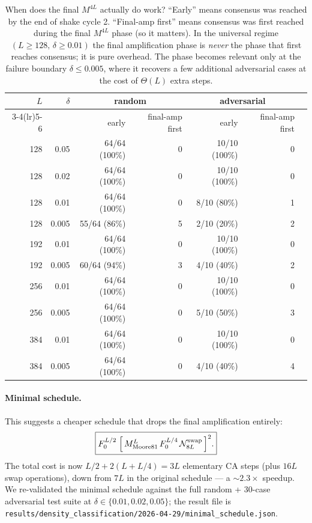 \documentclass[11pt,a4paper]{article}
\newcommand{\fpath}[1]{\nolinkurl{#1}}
\begin{document}
\begin{table}[h]\centering\small
\begin{tabular}{r r r r r r r}
\toprule
$L$ & $\delta$
    & \multicolumn{2}{c}{random}
    & \multicolumn{2}{c}{adversarial}
    & \\
\cmidrule(lr){3-4}\cmidrule(lr){5-6}
    &       & early & final-amp first & early & final-amp first \\
\midrule
128 & 0.05  & 64/64 (100\%) & 0  & 10/10 (100\%) & 0  \\
128 & 0.02  & 64/64 (100\%) & 0  & 10/10 (100\%) & 0  \\
128 & 0.01  & 64/64 (100\%) & 0  &  8/10 (80\%)  & 1  \\
128 & 0.005 & 55/64 (86\%)  & 5  &  2/10 (20\%)  & 2  \\
\midrule
192 & 0.01  & 64/64 (100\%) & 0  & 10/10 (100\%) & 0  \\
192 & 0.005 & 60/64 (94\%)  & 3  &  4/10 (40\%)  & 2  \\
\midrule
256 & 0.01  & 64/64 (100\%) & 0  & 10/10 (100\%) & 0  \\
256 & 0.005 & 64/64 (100\%) & 0  &  5/10 (50\%)  & 3  \\
\midrule
384 & 0.01  & 64/64 (100\%) & 0  & 10/10 (100\%) & 0  \\
384 & 0.005 & 64/64 (100\%) & 0  &  4/10 (40\%)  & 4  \\
\bottomrule
\end{tabular}
\caption{When does the final \(M^{4L}\) actually do work?  ``Early'' means
consensus was reached by the end of shake cycle 2.  ``Final-amp first'' means
consensus was first reached during the final \(M^{4L}\) phase (so it
matters).  In the universal regime
\((L\geq 128,\,\delta\geq 0.01)\) the final amplification phase is
\emph{never} the phase that first reaches consensus; it is pure
overhead.  The phase becomes relevant only at the failure boundary
\(\delta\leq 0.005\), where it recovers a few additional adversarial
cases at the cost of \(\Theta(L)\) extra steps.}
\label{tab:early-stop}
\end{table}

\paragraph{Minimal schedule.}
This suggests a cheaper schedule that drops the final amplification
entirely:
\[
\fbox{$
F_0^{L/2}
\;\Bigl[\,M_{\mathrm{Moore81}}^{L}\,F_0^{L/4}\,\mathcal{N}^{\mathrm{swap}}_{8L}\,\Bigr]^{2}.
$}
\]
The total cost is now \(L/2 + 2(L + L/4) = 3L\) elementary CA steps
(plus \(16L\) swap operations), down from \(7L\) in the original
schedule --- a \(\sim\!2.3\times\) speedup.  We re-validated the
minimal schedule against the full random + 30-case adversarial test
suite at \(\delta\in\{0.01, 0.02, 0.05\}\); the result file is
\fpath{results/density_classification/2026-04-29/minimal_schedule.json}.
\end{document}
